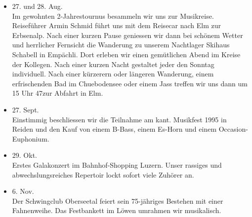 \begin{history}
\begin{itemize}
        \item 27. und 28. Aug.\\
              Im gewohnten 2-Jahrestournus besammeln wir uns zur Musikreise.
              Reiseführer Armin Schmid führt uns mit dem Reisecar nach Elm zur
              Erbsenalp. Nach einer kurzen Pause geniessen wir dann bei schönem Wetter
              und herrlicher Fernsicht die Wanderung zu unserem Nachtlager Skihaus
              Schabell in Empächli. Dort erleben wir einen gemütlichen Abend im Kreise
              der Kollegen. Nach einer kurzen Nacht gestaltet jeder den Sonntag
              individuell. Nach einer kürzerern oder längeren Wanderung, einem
              erfrischenden Bad im Chuebodensee oder einem Jass treffen wir uns dann
              um 15 Uhr 47zur Abfahrt in Elm.

        \item 27. Sept.\\
              Einstimmig beschliessen wir die Teilnahme am kant. Musikfest 1995 in
              Reiden und den Kauf von einem B-Bass, einem Es-Horn und einem
              Occasion-Euphonium.

        \item 29. Okt.\\
              Erstes Galakonzert im Bahnhof-Shopping Luzern. Unser rassiges und
              abwechslungsreiches Repertoir lockt sofort viele Zuhörer an.

        \item 6. Nov.\\
              Der Schwingclub Oberseetal feiert sein 75-jähriges Bestehen mit einer
              Fahnenweihe. Das Festbankett im Löwen umrahmen wir musikalisch.

    \end{itemize}

\end{history}
